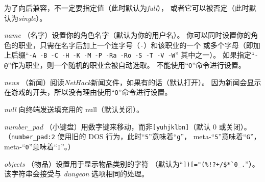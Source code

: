 \documentclass[a4paper, 10pt]{article}
\newcommand{\ib}[1]{\it #1 \hfill}
\begin{document}
为了向后兼容，不一定要指定值（此时默认为{\it full\/}），
或者它可以被否定（此时默认为{\it single\/}）。
\item[\ib{name}]
（名字）设置你的角色名字（默认为你的用户名）。
你可以同时设置你的角色的职业，只需在名字后加上一个连字号（{\tt -}）和该职业的一个
或多个字母（即加上后缀“{\tt -A -B -C -H -K -M -P -Ra -Ro -S -T -V -W}”
其中之一）。
如果指定“{\tt -@}”作为职业，则一个随机的职业会被自动选取。
不能使用“{\tt O}”命令进行设置。
\item[\ib{news}]
（新闻）阅读{\it NetHack\/}新闻文件，如果有的话（默认打开）。
因为新闻会显示在游戏的开头，所以没有理由使用“{\tt O}”命令进行设置。
\item[\ib{null}]
向终端发送填充用的 null（默认关闭）。
\item[\ib{number\_pad}]
（小键盘）用数字键来移动，而非{\tt [yuhjklbn]}（默认 0 或关闭）。
（{\tt number\_pad:2} 使用旧的 DOS 行为，此时“{\tt 5}”意味着“{\tt g}”，
meta-“{\tt 5}”意味着“{\tt G}”，meta-“{\tt 0}”意味着“{\tt I}”。）
\item[\ib{objects}]
（物品）设置用于显示物品类别的字符
（默认为“\verb&])[="(%!?+/$*`0_.&”）。
该字符串会接受与 {\it dungeon\/} 选项相同的处理。
\end{document}
